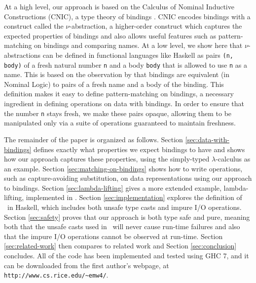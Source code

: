 \documentclass[natbib]{sigplanconf}
\begin{document}
At a high level, our approach is based on the Calculus of Nominal
Inductive Constructions (CNIC), a type theory of bindings
\cite{westbrook+09,westbrook-thesis}. CNIC encodes bindings with a
construct called the $\nu$-abstraction, a higher-order construct which
captures the expected properties of bindings and also allows useful
features such as pattern-matching on bindings and comparing names. At
a low level, we show here that $\nu$-abstractions can be defined in
functional languages like Haskell as pairs \lstinline{(n, body)} of a
fresh natural number \lstinline{n} and a body \lstinline{body} that is
allowed to use \lstinline{n} as a name.  This is based on the
observation by \citet{gabbaypitts02} that bindings are equivalent (in
Nominal Logic) to pairs of a fresh name and a body of the
binding. This definition makes it easy to define pattern-matching on
bindings, a necessary ingredient in defining operations on data with
bindings. In order to ensure that the number \lstinline{n} stays
fresh, we make these pairs opaque, allowing them to be manipulated
only via a suite of operations guaranteed to maintain freshness.

The remainder of the paper is organized as follows.  Section
\ref{sec:data-with-bindings} defines exactly what properties we expect bindings
to have and shows how our approach captures these properties, using the
simply-typed $\lambda$-calculus as an example.  Section
\ref{sec:matching-on-bindings} shows how to write operations, such as
capture-avoiding substitution, on data representations using our approach to
bindings.  Section \ref{sec:lambda-lifting} gives a more extended example,
lambda-lifting, implemented in \ourlib.  Section \ref{sec:implementation}
explores the definition of \ourlib\ in Haskell, which includes both unsafe type
casts and impure I/O operations. Section \ref{sec:safety} proves that our
approach is both type safe and pure, meaning both that the unsafe casts
used in \ourlib\ will never cause run-time failures and also that the impure
I/O operations cannot be observed at run-time.
Section \ref{sec:related-work} then compares to related work and
Section \ref{sec:conclusion} concludes.  All of the code has been
implemented and tested using GHC 7, and it can be downloaded from the
first author's webpage, at \lstinline{http://www.cs.rice.edu/~emw4/}.
\end{document}
